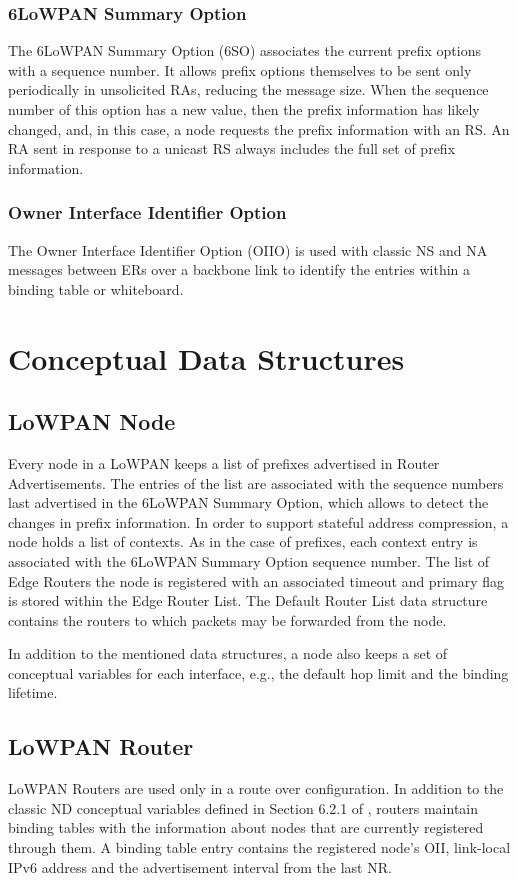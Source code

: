 \subsubsection{6LoWPAN Summary Option}\label{nd.option.summary}
The 6LoWPAN Summary Option (6SO) associates the current prefix options with a sequence number. It allows prefix options themselves to be sent only periodically in unsolicited RAs, reducing the message size. When the sequence number of this option has a new value, then the prefix information has likely changed, and, in this case, a node requests the prefix information with an RS. An RA sent in response to a unicast RS always includes the full set of prefix information.

\subsubsection{Owner Interface Identifier Option}\label{sec:nd.oiio}
The Owner Interface Identifier Option (OIIO) is used with classic NS and NA messages between ERs over a backbone link to identify the entries within a binding table or whiteboard.

\section{Conceptual Data Structures }
\subsection{LoWPAN Node}
Every node in a LoWPAN keeps a list of prefixes advertised in Router Advertisements. The entries of the list are associated with the sequence numbers last advertised in the 6LoWPAN Summary Option, which allows to detect the changes in prefix information. In order to support stateful address compression, a node holds a list of contexts. As in the case of prefixes, each context entry is associated with the 6LoWPAN Summary Option sequence number. The list of Edge Routers the node is registered with an associated timeout and primary flag is stored within the Edge Router List. 
The Default Router List data structure contains the routers to which packets may be forwarded from the node. 

In addition to the mentioned data structures, a node also keeps a set of conceptual variables for each interface, e.g., the default hop limit and the binding lifetime.

\subsection{LoWPAN Router}
LoWPAN Routers are used only in a route over configuration. In addition to the classic ND conceptual variables defined in Section 6.2.1 of \cite{rfc4861}, routers maintain binding tables with the information about nodes that are currently registered through them. A binding table entry  contains the registered node's OII, link-local IPv6 address and the advertisement interval from the last NR.

